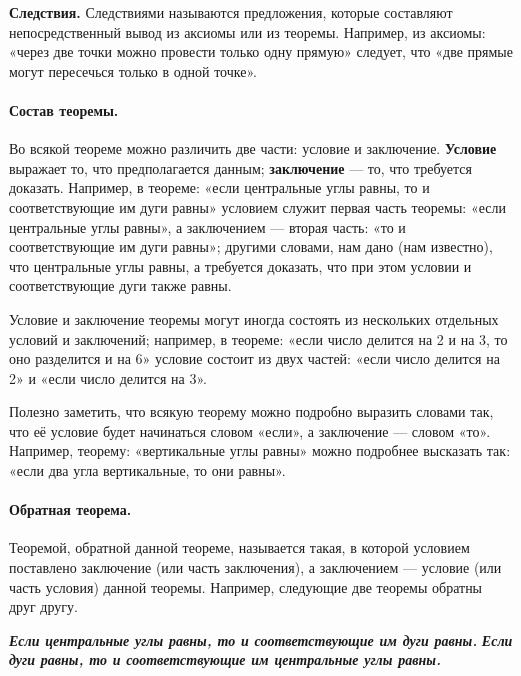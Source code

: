 \documentclass[twoside]{book}
\begin{document}
\textbf{Следствия.}
Следствиями называются предложения, которые составляют непосредственный вывод из аксиомы или из теоремы.
Например, из аксиомы:
«через две точки можно провести только одну прямую» следует, что «две прямые могут пересечься только в одной точке».

\paragraph{Состав теоремы.}\label{1938/29}
Во всякой теореме можно различить две части:
условие и заключение.
\textbf{Условие} выражает то, что предполагается данным;
\textbf{заключение} — то, что требуется доказать.
Например, в теореме:
«если центральные углы равны, то и соответствующие им дуги равны» условием служит первая часть теоремы:
«если центральные углы равны», а заключением — вторая часть:
«то и соответствующие им дуги равны»;
другими словами, нам дано (нам известно), что центральные углы равны, а требуется доказать, что при этом условии и соответствующие дуги также равны.

Условие и заключение теоремы могут иногда состоять из нескольких отдельных условий и заключений;
например, в теореме:
«если число делится на 2 и на 3, то оно разделится и на 6» условие состоит из двух частей:
«если число делится на 2» и «если число делится на 3».

Полезно заметить, что всякую теорему можно подробно выразить словами так, что её условие будет начинаться словом «если», а заключение — словом «то».
Например, теорему:
«вертикальные углы равны» можно подробнее высказать так:
«если два угла вертикальные, то они равны».

\paragraph{Обратная теорема.}\label{1938/30}
Теоремой, обратной данной теореме, называется такая, в которой условием поставлено заключение (или часть заключения), а заключением — условие (или часть условия) данной теоремы.
Например, следующие две теоремы обратны друг другу.

\medskip

\setlength{\columnseprule}{.2pt}
\begin{paracol}{2}
 \textbf{\emph{Если центральные углы равны, то и соответствующие им дуги равны.}}
\switchcolumn
\textbf{\emph{Если дуги равны, то и соответствующие им центральные углы равны.}}
\end{paracol}
\end{document}
